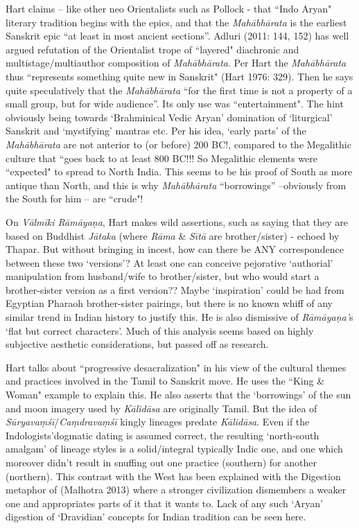 Hart claims – like other neo Orientalists such as Pollock - that “Indo Aryan" literary tradition begins with the epics, and that the \textit{Mahābhārata} is the earliest Sanskrit epic “at least in most ancient sections”. Adluri (2011: 144, 152) has well argued refutation of the Orientalist trope of “layered" diachronic and multistage/multiauthor composition of \textit{Mahābhārata}. Per Hart the \textit{Mahābhārata} thus “represents something quite new in Sanskrit" (Hart 1976: 329). Then he says quite speculatively that the \textit{Mahābhārata } “for the first time is not a property of a small group, but for wide audience”. Its only use was “entertainment". The hint obviously being towards ‘Brahminical Vedic Aryan’ domination of ‘liturgical’ Sanskrit and ‘mystifying’ mantras etc. Per his idea, ‘early parts’ of the \textit{Mahābhārata } are not anterior to (or before) 200 BC!, compared to the Megalithic culture that “goes back to at least 800 BC!!! So Megalithic elements were “expected" to spread to North India. This seems to be his proof of South as more antique than North, and this is why \textit{Mahābhārata } “borrowings” –obviously from the South for him – are “crude"!

On \textit{Vālmīki Rāmāyaṇa}, Hart makes wild assertions, such as saying that they are based on Buddhist \textit{Jātaka} (where \textit{Rāma} \& \textit{Sītā } are brother/sister) - echoed by Thapar. But without bringing in incest, how can there be ANY correspondence between these two ‘versions’? At least one can conceive pejorative ‘authorial’ manipulation from husband/wife to brother/sister, but who would start a brother-sister version as a first version?? Maybe ‘inspiration’ could be had from Egyptian Pharaoh brother-sister pairings, but there is no known whiff of any similar trend in Indian history to justify this. He is also dismissive of \textit{Rāmāyaṇa’}s ‘flat but correct characters’. Much of this analysis seems based on highly subjective aesthetic considerations, but passed off as research.

Hart talks about “progressive desacralization" in his view of the cultural themes and practices involved in the Tamil to Sanskrit move. He uses the “King \& Woman" example to explain this. He also asserts that the ‘borrowings’ of the sun and moon imagery used by \textit{Kālidāsa} are originally Tamil. But the idea of \textit{Sūryavaṃśī}/\textit{Caṃdravaṃśī} kingly lineages predate \textit{Kālidāsa}. Even if the Indologists’dogmatic dating is assumed correct, the resulting ‘north-south amalgam’ of lineage styles is a solid/integral typically Indic one, and one which moreover didn’t result in snuffing out one practice (southern) for another (northern). This contrast with the West has been explained with the Digestion metaphor of (Malhotra 2013) where a stronger civilization dismembers a weaker one and appropriates parts of it that it wants to. Lack of any such ‘Aryan’ digestion of ‘Dravidian’ concepts for Indian tradition can be seen here.

